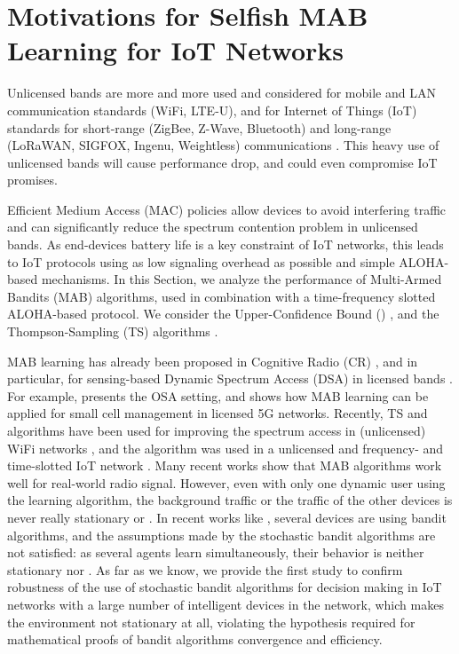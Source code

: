 \section{Motivations for Selfish MAB Learning for IoT Networks}
\label{sec:4:motivations}

Unlicensed bands are more and more used and considered for mobile and LAN communication standards (WiFi, LTE-U), and for Internet of Things (IoT) standards for short-range (ZigBee, Z-Wave, Bluetooth) and long-range (LoRaWAN, SIGFOX, Ingenu, Weightless) communications \cite{Centenaro16}.
This heavy use of unlicensed bands will cause performance drop, and could even compromise IoT promises.

Efficient Medium Access (MAC) policies allow devices to avoid interfering traffic and can significantly reduce the spectrum contention problem in unlicensed bands.
As end-devices battery life is a key constraint of IoT networks,
this leads to IoT protocols using as low signaling overhead as possible and simple ALOHA-based mechanisms.
%
In this Section, we analyze the performance of Multi-Armed Bandits (MAB) algorithms, used in combination with a time-frequency slotted ALOHA-based protocol.
We consider the Upper-Confidence Bound (\UCB) \cite{Auer02}, and the Thompson-Sampling (TS) algorithms \cite{Thompson33,AgrawalGoyal11,
Kaufmann12Thompson}.

MAB learning has already been proposed in Cognitive Radio (CR) \cite{Haykin05}, and in particular, for sensing-based Dynamic Spectrum Access (DSA) in licensed bands \cite{Jouini10}.
For example, \cite{Jouini10} presents the OSA setting, and \cite{Maghsudi16} shows how MAB learning can be applied for small cell management in licensed 5G networks.
Recently, TS and \UCB{} algorithms have been used for improving the spectrum access in (unlicensed) WiFi networks \cite{Toldov16}, and the \UCB{} algorithm was used in a unlicensed and frequency- and time-slotted IoT network \cite{Bonnefoi17}.
Many recent works show that MAB algorithms work well for real-world radio signal.
However, even with only one dynamic user using the learning algorithm, the background traffic or the traffic of the other devices is never really stationary or \iid{}.
In recent works like \cite{Bonnefoi17}, several devices are using bandit algorithms, and the assumptions made by the stochastic bandit algorithms are not satisfied: as several agents learn simultaneously, their behavior is neither stationary nor \iid.
As far as we know, we provide the first study to confirm robustness of the use of stochastic bandit algorithms for decision making in IoT networks with a large number of intelligent devices in the network, which makes the environment not stationary at all, violating the hypothesis required for mathematical proofs of bandit algorithms convergence and efficiency.


